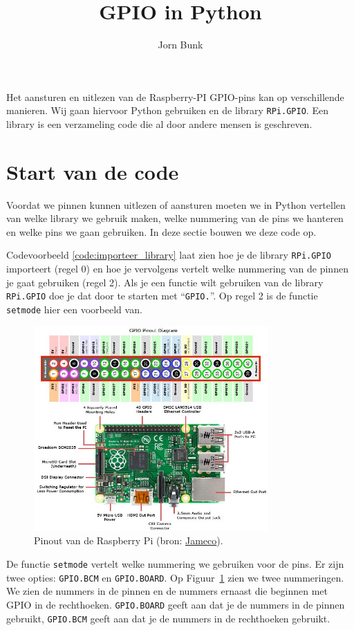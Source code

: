 \documentclass{guide}
\title{GPIO in Python}
\author{Jorn Bunk}
\begin{document}
Het aansturen en uitlezen van de Raspberry-PI GPIO-pins kan op verschillende manieren. Wij gaan hiervoor Python gebruiken en de library \texttt{RPi.GPIO}. Een library is een verzameling code die al door andere mensen is geschreven.

\section{Start van de code}
\label{sec:start_code}
Voordat we pinnen kunnen uitlezen of aansturen moeten we in Python vertellen van welke library we gebruik maken, welke nummering van de pins we hanteren en welke pins we gaan gebruiken. In deze sectie bouwen we deze code op.

Codevoorbeeld \ref{code:importeer_library} laat zien hoe je de library \texttt{RPi.GPIO} importeert (regel 0) en hoe je vervolgens vertelt welke nummering van de pinnen je gaat gebruiken (regel 2). Als je een functie wilt gebruiken van de library \texttt{RPi.GPIO} doe je dat door te starten met \enquote{\texttt{GPIO.}}. Op regel 2 is de functie \texttt{setmode} hier een voorbeeld van.

\begin{figure}[h]
  \centering
  \includegraphics[width=0.8\textwidth]{images/pinout.png}
  \caption{Pinout van de Raspberry Pi (bron: \href{https://www.jameco.com/Jameco/workshop/circuitnotes/raspberry-pi-circuit-note.html}{Jameco}).} \label{fig:pinout}
\end{figure}

De functie \texttt{setmode} vertelt welke nummering we gebruiken voor de pins. Er zijn twee opties: \texttt{GPIO.BCM} en \texttt{GPIO.BOARD}. Op Figuur~\ref{fig:pinout} zien we twee nummeringen. We zien de nummers in de pinnen en de nummers ernaast die beginnen met GPIO in de rechthoeken. \texttt{GPIO.BOARD} geeft aan dat je de nummers in de pinnen gebruikt, \texttt{GPIO.BCM} geeft aan dat je de nummers in de rechthoeken gebruikt.
\end{document}
